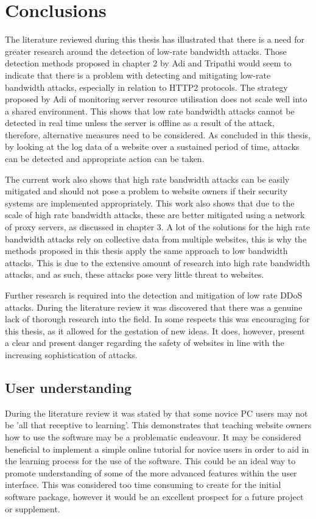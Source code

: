 \section{Conclusions}

The literature reviewed during this thesis has illustrated that there is a need for greater research around the detection of low-rate bandwidth attacks. Those detection methods proposed in chapter 2 by Adi and Tripathi would seem to indicate that there is a problem with detecting and mitigating low-rate bandwidth attacks, especially in relation to HTTP2 protocols. The strategy proposed by Adi of monitoring server resource utilisation does not scale well into a shared environment. This shows that low rate bandwidth attacks cannot be detected in real time unless the server is offline as a result of the attack, therefore, alternative measures need to be considered. As concluded in this thesis, by looking at the log data of a website over a sustained period of time, attacks can be detected and appropriate action can be taken.

The current work also shows that high rate bandwidth attacks can be easily mitigated and should not pose a problem to website owners if their security systems are implemented appropriately. This work also shows that due to the scale of high rate bandwidth attacks, these are better mitigated using a network of proxy servers, as discussed in chapter 3. A lot of the solutions for the high rate bandwidth attacks rely on collective data from multiple websites, this is why the methods proposed in this thesis apply the same approach to low bandwidth attacks. This is due to the extensive amount of research into high rate bandwidth attacks, and as such, these attacks pose very little threat to websites. 

Further research is required into the detection and mitigation of low rate DDoS attacks. During the literature review it was discovered that there was a genuine lack of thorough research into the field. In some respects this was encouraging for this thesis, as it allowed for the gestation of new ideas. It does, however, present a clear and present danger regarding the safety of websites in line with the increasing sophistication of attacks.


\subsection{User understanding}

During the literature review it was stated by \citeauthor{cranor2008framework} that some novice PC users may not be 'all that receptive to learning'. This demonstrates that teaching website owners how to use the software may be a problematic endeavour. It may be considered beneficial to implement a simple online tutorial for novice users in order to aid in the learning process for the use of the software. This could be an ideal way to promote understanding of some of the more advanced features within the user interface. This was considered too time consuming to create for the initial software package, however it would be an excellent prospect for a future project or supplement.

